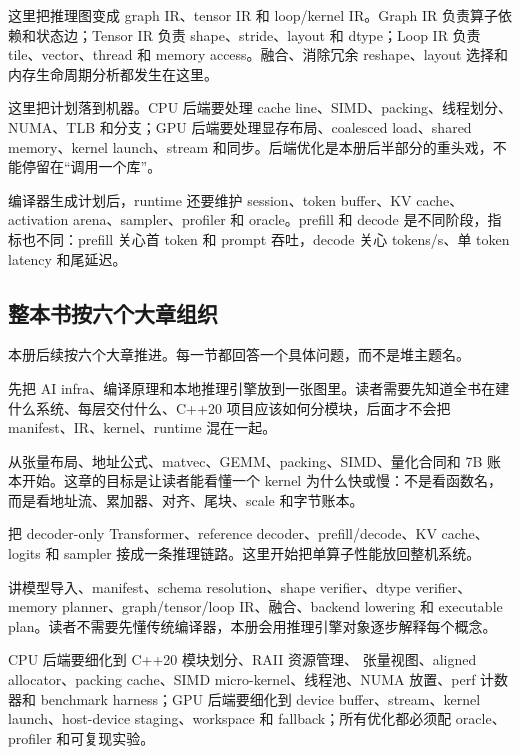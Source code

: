  这里把推理图变成 graph IR、tensor IR 和 loop/kernel IR。Graph IR 负责算子依赖和状态边；Tensor IR 负责 shape、stride、layout 和 dtype；Loop IR 负责 tile、vector、thread 和 memory access。融合、消除冗余 reshape、layout 选择和内存生命周期分析都发生在这里。

 这里把计划落到机器。CPU 后端要处理 cache line、SIMD、packing、线程划分、NUMA、TLB 和分支；GPU 后端要处理显存布局、coalesced load、shared memory、kernel launch、stream 和同步。后端优化是本册后半部分的重头戏，不能停留在“调用一个库”。

 编译器生成计划后，runtime 还要维护 session、token buffer、KV cache、activation arena、sampler、profiler 和 oracle。prefill 和 decode 是不同阶段，指标也不同：prefill 关心首 token 和 prompt 吞吐，decode 关心 tokens/s、单 token latency 和尾延迟。

\subsection{整本书按六个大章组织}

本册后续按六个大章推进。每一节都回答一个具体问题，而不是堆主题名。

 先把 AI infra、编译原理和本地推理引擎放到一张图里。读者需要先知道全书在建什么系统、每层交付什么、C++20 项目应该如何分模块，后面才不会把 manifest、IR、kernel、runtime 混在一起。

 从张量布局、地址公式、matvec、GEMM、packing、SIMD、量化合同和 7B 账本开始。这章的目标是让读者能看懂一个 kernel 为什么快或慢：不是看函数名，而是看地址流、累加器、对齐、尾块、scale 和字节账本。

 把 decoder-only Transformer、reference decoder、prefill/decode、KV cache、logits 和 sampler 接成一条推理链路。这里开始把单算子性能放回整机系统。

 讲模型导入、manifest、schema resolution、shape verifier、dtype verifier、memory planner、graph/tensor/loop IR、融合、backend lowering 和 executable plan。读者不需要先懂传统编译器，本册会用推理引擎对象逐步解释每个概念。

 CPU 后端要细化到 C++20 模块划分、RAII 资源管理、 张量视图、aligned allocator、packing cache、SIMD micro-kernel、线程池、NUMA 放置、perf 计数器和 benchmark harness；GPU 后端要细化到 device buffer、stream、kernel launch、host-device staging、workspace 和 fallback；所有优化都必须配 oracle、profiler 和可复现实验。

